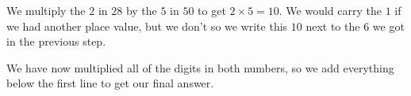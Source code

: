 \documentclass{ximera}
\begin{document}
We multiply the $2$ in $28$ by the $5$ in $50$ to get $2 \times 5 = 10$. We would carry the $1$ if we had another place value, but we don't so we write this $10$ next to the $6$ we got in the previous step.

\begin{image}
\end{image}

We have now multiplied all of the digits in both numbers, so we add everything below the first line to get our final answer.
\end{document}

